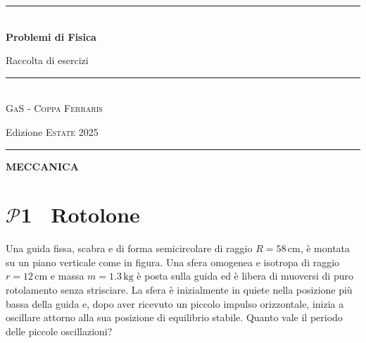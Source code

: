 \documentclass[a4paper,12pt]{article}
\newcommand{\problemtitle}[1]{
  \noindent
  \textbf{\Large #1}\hspace{0.5em}
  \raisebox{0.6ex}{\rule{\linewidth - \widthof{\textbf{\Large #1}} - 0.6em}{0.4pt}}%
}
\newcommand{\sectionpage}[1]{
  \clearpage
  \thispagestyle{sectionpage} 
  \vspace*{\fill}
  \begin{center}
    \Huge\bfseries #1
  \end{center}
  \vspace*{\fill}
  \clearpage
}
\begin{document}
\begin{titlepage}
    \centering
    \vspace*{1cm}
    
    
    \rule{\textwidth}{0.8pt}\\[1cm]
    
    {\fontsize{28}{32}\selectfont\bfseries
        Problemi di Fisica\\[0.5cm]
    }
    
    {\fontsize{14}{26}\selectfont
        Raccolta di esercizi \\[1cm]
    }
    
    \rule{\textwidth}{0.4pt}\\[2cm]
    

    {\large
        \textsc{GaS - Coppa Ferraris}\\[2.4cm]}

    
    {\large
        \textcolor{subtitlecolor}{Edizione \textsc{Estate 2025}}
    }
    
    \vfill
    \rule{\textwidth}{1pt}
    
\end{titlepage}

\newpage


\tableofcontents
\thispagestyle{plain}
\newpage


\sectionpage{MECCANICA}
{}

\section*{\problemtitle{$\mathcal{P}${\small{1}} \ Rotolone}}

Una guida fissa, scabra e di forma semicircolare di raggio \( R = 58 \, \si{\centi\meter} \), è montata su un piano verticale come in figura. Una sfera omogenea e isotropa di raggio \( r = 12 \, \si{\centi\meter}\) e massa \( m = 1.3 \, \si{\kilo\gram}\) è posta sulla guida ed è libera di muoversi di puro rotolamento senza strisciare. La sfera è inizialmente in quiete nella posizione più bassa della guida e, dopo aver ricevuto un piccolo impulso orizzontale, inizia a oscillare attorno alla sua posizione di equilibrio stabile. Quanto vale il periodo delle piccole oscillazioni?

\vspace{0.5em}
\end{document}
